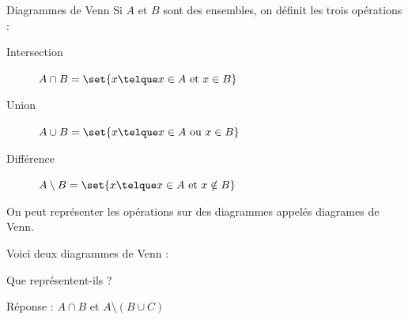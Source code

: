 \documentclass[french,xcolor=svgnames]{beamer}
\begin{document}
\begin{frame}{Diagrammes de Venn}
Si  \(A\) et \(B\) sont des ensembles, on définit les trois opérations :
  \begin{description}
  \item[Intersection] $A \cap B = \set{ x \telque \text{\(x \in A\) et \(x \in B\)}}$
  \item[Union] $A \cup B = \set{ x \telque \text{\(x \in A\) ou \(x \in B\)}}$
  \item[Différence] $A \setminus B = \set{ x \telque \text{\(x \in A\) et \(x \notin B\)}}$
  \end{description}\pause

On peut représenter les opérations sur des diagrammes appelés diagrames de Venn.
\end{frame}

\begin{frame}
  \begin{exercise}
    Voici deux diagrammes de Venn :
    \begin{center}
      \raisebox{-.5\height}{\begin{venndiagram2sets}[shade=red] \fillACapB
        \end{venndiagram2sets}} \raisebox{-.5\height}{\begin{venndiagram3sets}[shade=green] \fillOnlyA
        \end{venndiagram3sets}}
    \end{center}
    Que représentent-ils ?
  \end{exercise}\pause

  Réponse : \(A \cap B\) et \(A\setminus (B\cup C)\)
\end{frame}
\end{document}
